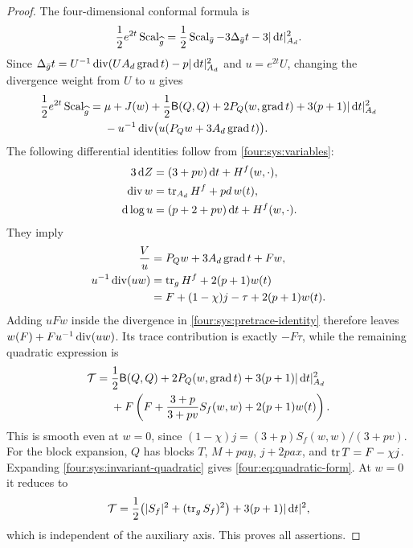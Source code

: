 \begin{proof}
The four-dimensional conformal formula is
\[
 \frac12e^{2t}\operatorname{Scal}_{\widehat g}
  =\frac12\operatorname{Scal}_{\bar g}-3\Delta_{\bar g}t-3|\,\mathrm d t|_{A_d}^2.
\]
Since
$\Delta_{\bar g}t=U^{-1}\operatorname{div}(UA_d\operatorname{grad} t)-p|\,\mathrm d t|_{A_d}^2$
and $u=e^{2t}U$, changing the divergence weight from $U$ to $u$ gives
\begin{equation}\label{four:sys:pretrace-identity}
\begin{aligned}
 \frac12e^{2t}\operatorname{Scal}_{\widehat g}
 ={}&\mu+J(w)+\frac12\mathsf B(Q,Q)+2P_Q(w,\operatorname{grad} t)
               +3(p+1)|\,\mathrm d t|_{A_d}^2\\
 &-u^{-1}\operatorname{div}\bigl(u(P_Qw+3A_d\operatorname{grad} t)\bigr).
\end{aligned}
\end{equation}
The following differential identities follow from \eqref{four:sys:variables}:
\begin{equation}\label{four:sys:differential-identities}
\begin{aligned}
 3\,\mathrm d Z&=(3+pv)\,\mathrm d t+H^f(w,\cdot),\\
 \operatorname{div} w&=\operatorname{tr}_{A_d}H^f+p d\,w(t),\\
 \,\mathrm d\log u&=(p+2+pv)\,\mathrm d t+H^f(w,\cdot).
\end{aligned}
\end{equation}
They imply
\begin{equation}\label{four:sys:trace-divergence}
\begin{aligned}
 \frac Vu&=P_Qw+3A_d\operatorname{grad} t+Fw,\\
 u^{-1}\operatorname{div}(uw)
  &=\operatorname{tr}_gH^f+2(p+1)w(t)\\
  &=F+(1-\chi)j-\tau+2(p+1)w(t).
\end{aligned}
\end{equation}
Adding $uFw$ inside the divergence in
\eqref{four:sys:pretrace-identity} therefore leaves
$w(F)+F u^{-1}\operatorname{div}(uw)$.  Its trace contribution is exactly
$-F\tau$, while the remaining quadratic expression is
\begin{equation}\label{four:sys:invariant-quadratic}
\begin{aligned}
 \mathcal T={}&\frac12\mathsf B(Q,Q)+2P_Q(w,\operatorname{grad} t)
          +3(p+1)|\,\mathrm d t|_{A_d}^2\\
 &+F\left(F+\frac{3+p}{3+pv}S_f(w,w)+2(p+1)w(t)\right).
\end{aligned}
\end{equation}
This is smooth even at $w=0$, since
$(1-\chi)j=(3+p)S_f(w,w)/(3+pv)$.  For the block expansion, $Q$ has
blocks $T$, $M+pay$, $j+2pax$, and $\operatorname{tr} T=F-\chi j$.
Expanding \eqref{four:sys:invariant-quadratic} gives
\eqref{four:eq:quadratic-form}.  At $w=0$ it reduces to
\[
 \mathcal T=\frac12\bigl(|S_f|^2+(\operatorname{tr}_gS_f)^2\bigr)
                      +3(p+1)|\,\mathrm d t|^2,
\]
which is independent of the auxiliary axis.  This proves all assertions.
\end{proof}

